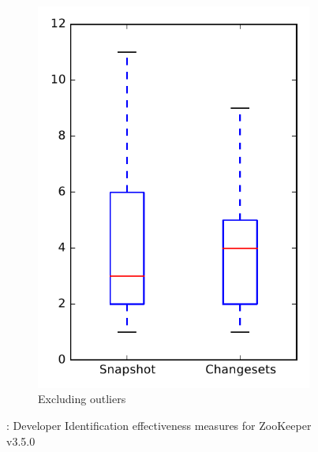 \begin{figure}
\begin{subfigure}{.4\textwidth}
        \includegraphics[height=0.4\textheight]{figures/dit/rq1_zookeeper_no_outlier}
        \caption{Excluding outliers}\label{fig:dit:rq1:zookeeper_no_outlier}
    \end{subfigure}
\caption{\done: Developer Identification effectiveness measures for ZooKeeper v3.5.0}
\label{fig:dit:rq1:zookeeper}
\end{figure}
